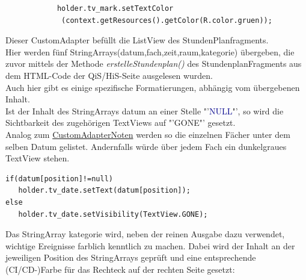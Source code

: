 \begin{description}
\begin{lstlisting}
            holder.tv_mark.setTextColor
             (context.getResources().getColor(R.color.gruen));
\end{lstlisting}
\newpage
{}
\label{CustomAdapterStundenplan}
Dieser CustomAdapter befüllt die ListView des StundenPlanfragments.\\
Hier werden fünf StringArrays(\textcolor{lila}{datum},\textcolor{lila}{fach},\textcolor{lila}{zeit},\textcolor{lila}{raum},\textcolor{lila}{kategorie}) übergeben, die zuvor mittels der Methode \textit{erstelleStundenplan()} des StundenplanFragments aus dem HTML-Code der QiS/HiS-Seite ausgelesen wurden.\\
Auch hier gibt es einige spezifische Formatierungen, abhängig vom übergebenen Inhalt.\\
Ist der Inhalt des StringArrays \textcolor{lila}{datum} an einer Stelle "'\textcolor{darkblue}{NULL}"', so wird die Sichtbarkeit des zugehörigen TextViews auf  "'\textcolor{lila}{GONE}"' gesetzt.\\
Analog zum \hyperref[CustomAdapterNoten]{CustomAdapterNoten} werden so die einzelnen Fächer unter dem selben Datum gelistet. Andernfalls würde über jedem Fach ein dunkelgraues TextView stehen.
\begin{lstlisting}
if(datum[position]!=null)
   holder.tv_date.setText(datum[position]);
else
   holder.tv_date.setVisibility(TextView.GONE);
\end{lstlisting}
Das StringArray \textcolor{lila}{kategorie} wird, neben der reinen Ausgabe dazu verwendet, wichtige Ereignisse farblich kenntlich zu machen. Dabei wird der Inhalt an der jeweiligen Position des StringArrays geprüft und eine entsprechende (CI/CD-)Farbe für das Rechteck auf der rechten Seite gesetzt:


\end{description}
